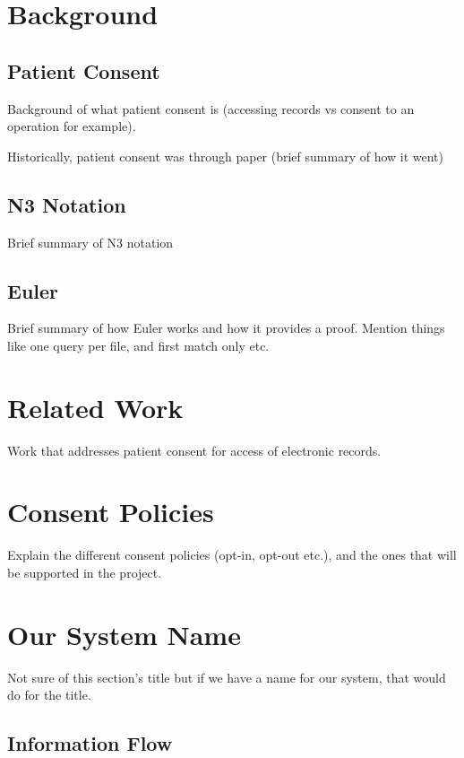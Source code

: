 \documentclass[conference]{IEEEtran}
\begin{document}
\section{Background}
\label{bg-sec}

\subsection{Patient Consent}
\label{pat-consent}
Background of what patient consent is (accessing records vs consent to an operation for example).

Historically, patient consent was through paper (brief summary of how it went)


\subsection{N3 Notation}

Brief summary of N3 notation

\subsection{Euler}

Brief summary of how Euler works and how it provides a proof. Mention things like one query per file, and first match only etc.


\section{Related Work}
\label{rel-work}

Work that addresses patient consent for access of electronic records.


\section{Consent Policies}
\label{cons-polic}

Explain the different consent policies (opt-in, opt-out etc.), and the ones that will be supported in the project.

\section{Our System Name}
\label{main-sys}

Not sure of this section's title but if we have a name for our system, that would do for the title. 

\subsection{Information Flow}
\label{info-flow}
\end{document}
